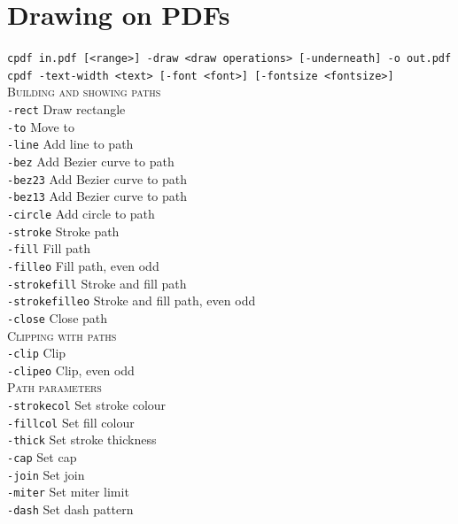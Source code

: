 \documentclass{book}
\begin{document}
\clearpage\pagestyle{empty}
\chapter{Drawing on PDFs}\label{chap:18}\pagestyle{fancy}

  {\small\begin{framed}

   \noindent\verb!cpdf in.pdf [<range>] -draw <draw operations> [-underneath] -o out.pdf!\\
   \noindent\verb!cpdf -text-width <text> [-font <font>] [-fontsize <fontsize>]!\\

   \vspace{1.5mm}
   \noindent \textsc{Building and showing paths}\\
   \noindent\verb!-rect! Draw rectangle\\
   \noindent\verb!-to! Move to\\
   \noindent\verb!-line! Add line to path\\
   \noindent\verb!-bez! Add Bezier curve to path\\
   \noindent\verb!-bez23! Add Bezier curve to path\\
   \noindent\verb!-bez13! Add Bezier curve to path\\
   \noindent\verb!-circle! Add circle to path\\
   \noindent\verb!-stroke! Stroke path\\
   \noindent\verb!-fill! Fill path\\
   \noindent\verb!-filleo! Fill path, even odd\\
   \noindent\verb!-strokefill! Stroke and fill path\\
   \noindent\verb!-strokefilleo! Stroke and fill path, even odd\\
   \noindent\verb!-close! Close path\\

   \vspace{1.5mm}
   \noindent \textsc{Clipping with paths}\\
   \noindent\verb!-clip! Clip\\
   \noindent\verb!-clipeo! Clip, even odd\\

   \vspace{1.5mm}
   \noindent \textsc{Path parameters}\\
   \noindent\verb!-strokecol! Set stroke colour\\
   \noindent\verb!-fillcol! Set fill colour\\
   \noindent\verb!-thick! Set stroke thickness\\
   \noindent\verb!-cap! Set cap\\
   \noindent\verb!-join! Set join\\
   \noindent\verb!-miter! Set miter limit\\
   \noindent\verb!-dash! Set dash pattern\\


\end{framed}}
\end{document}
